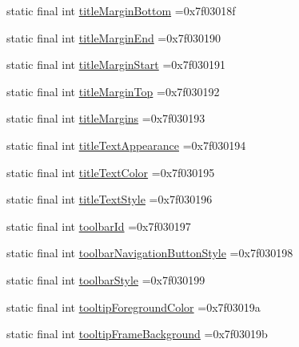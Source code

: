 \begin{DoxyCompactItemize}
\item 
static final int \mbox{\hyperlink{classcom_1_1example_1_1trainawearapplication_1_1_r_1_1attr_a973e482fdf6d971c3c6d041f403ea72d}{title\+Margin\+Bottom}} =0x7f03018f
\item 
static final int \mbox{\hyperlink{classcom_1_1example_1_1trainawearapplication_1_1_r_1_1attr_a9888cd8bb9187fa5f389980f1815eb03}{title\+Margin\+End}} =0x7f030190
\item 
static final int \mbox{\hyperlink{classcom_1_1example_1_1trainawearapplication_1_1_r_1_1attr_a9a63514ed04003c5630659a438d07c2d}{title\+Margin\+Start}} =0x7f030191
\item 
static final int \mbox{\hyperlink{classcom_1_1example_1_1trainawearapplication_1_1_r_1_1attr_af968df1a7cf49d006da04fb044fd9529}{title\+Margin\+Top}} =0x7f030192
\item 
static final int \mbox{\hyperlink{classcom_1_1example_1_1trainawearapplication_1_1_r_1_1attr_af894c6bf018c309ec3144ae34932f5d4}{title\+Margins}} =0x7f030193
\item 
static final int \mbox{\hyperlink{classcom_1_1example_1_1trainawearapplication_1_1_r_1_1attr_ac78eb1665e04a23d707b7a743835a6e6}{title\+Text\+Appearance}} =0x7f030194
\item 
static final int \mbox{\hyperlink{classcom_1_1example_1_1trainawearapplication_1_1_r_1_1attr_ab48157b601f87e32ca393ae840611a74}{title\+Text\+Color}} =0x7f030195
\item 
static final int \mbox{\hyperlink{classcom_1_1example_1_1trainawearapplication_1_1_r_1_1attr_a60eaa58b691c978bc51934b3d8e97662}{title\+Text\+Style}} =0x7f030196
\item 
static final int \mbox{\hyperlink{classcom_1_1example_1_1trainawearapplication_1_1_r_1_1attr_aa3b30bdbaa8dc8cc6512a4edbf6bbce7}{toolbar\+Id}} =0x7f030197
\item 
static final int \mbox{\hyperlink{classcom_1_1example_1_1trainawearapplication_1_1_r_1_1attr_a1b2dab30a135801184ef61ca625e597f}{toolbar\+Navigation\+Button\+Style}} =0x7f030198
\item 
static final int \mbox{\hyperlink{classcom_1_1example_1_1trainawearapplication_1_1_r_1_1attr_a24aa9f7f775e768fb50c5284f9e0f482}{toolbar\+Style}} =0x7f030199
\item 
static final int \mbox{\hyperlink{classcom_1_1example_1_1trainawearapplication_1_1_r_1_1attr_ae905b136fb9dcb8842c5f02cc2aba1bd}{tooltip\+Foreground\+Color}} =0x7f03019a
\item 
static final int \mbox{\hyperlink{classcom_1_1example_1_1trainawearapplication_1_1_r_1_1attr_a7467e0d94f09788a22d5638bde77d239}{tooltip\+Frame\+Background}} =0x7f03019b

\end{DoxyCompactItemize}
